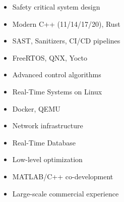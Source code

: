 \documentclass[10pt,a4paper,ragged2e,withhyper]{altacv}
\begin{document}
\begin{paracol}{2}
    \begin{itemize}
        \item Safety critical system design
    \smallskip
        \item Modern C++ (11/14/17/20), Rust
    \smallskip
        \item SAST, Sanitizers, CI/CD pipelines
    \smallskip
        \item FreeRTOS, QNX, Yocto
    \smallskip
        \item Advanced control algorithms
    \smallskip
        \item Real-Time Systems on Linux
    \smallskip
        \item Docker, QEMU
    \smallskip
        \item Network infrastructure
    \smallskip
        \item Real-Time Database
    \smallskip
        \item Low-level optimization
    \smallskip
        \item MATLAB/C++ co-development
    \smallskip
        \item Large-scale commercial experience
    \end{itemize}

\end{paracol}
\end{document}
